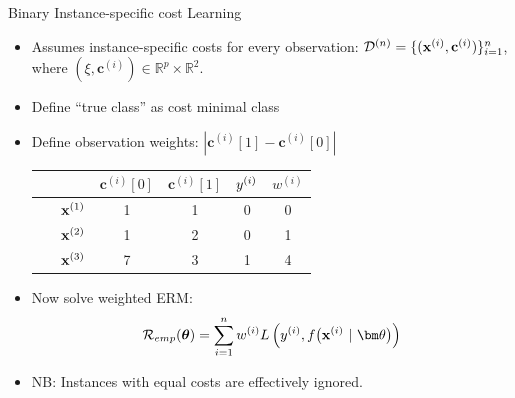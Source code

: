 \documentclass[11pt,compress,t,notes=noshow, xcolor=table]{beamer}
\newcommand{\cv}{\mathbf{c}}
\begin{document}
\begin{frame}{Binary Instance-specific cost Learning}
    \begin{itemize}
        \item Assumes instance-specific costs for every observation:  $\D^{(n)} = \{(\xi, \cv^{(i)})\}_{i=1}^n$, where $(\xi, \cv^{(i)}) \in \mathbb{R}^p \times \mathbb{R}^2$.

        \item Define ``true class'' as cost minimal class
        
        \item Define observation weights: $|\cv^{(i)}[1] - \cv^{(i)}[0]|$

        \begin{center}
            \begin{tabular}{cc|cccc}\
        			& & $\cv^{(i)}[0]$ & $\cv^{(i)}[1]$ & $y^{(i)}$ & $w^{(i)}$ \\
        			\hline & $\mathbf{x}^{(1)}$ & 1 & 1 & 0 & 0\\
        			& $\mathbf{x}^{(2)}$ & 1 & 2 & 0 & 1\\
        			& $\mathbf{x}^{(3)}$ & 7 & 3 & 1 & 4\\
            \end{tabular}
        \end{center}

        \item Now solve weighted ERM:
        \begin{equation*}
            \mathcal{R}_{emp}(\boldsymbol{\theta}) = \sum_{i=1}^{n}w^{(i)} \Lxyit
        \end{equation*}
        
        \item NB: Instances with equal costs are effectively ignored.
        \end{itemize}
            
\end{frame}
\end{document}
